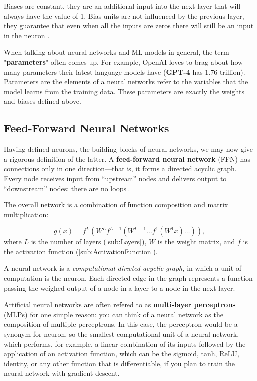 \documentclass{article}
\begin{document}
\begin{definition}[Bias]\label{def:bias}
  Biases are constant, they are an additional input into the next layer that will always have the value of 1. Bias units are not influenced by the previous layer, they guarantee that even when all the inputs are zeros there will still be an input in the neuron \citep{WeightsBias}. 
\end{definition}

When talking about neural networks and ML models in general, the term "\textbf{parameters}" often comes up. For example, OpenAI loves to brag about how many parameters their latest language models have (\textbf{GPT-4} has $1.76$ trillion). Parameters are the elements of a neural networks refer to the variables that the model learns from the training data. These parameters are exactly the weights and biases defined above.
\subsection{Feed-Forward Neural Networks}%
  \label{sub:Feed-Forward Neural Networks}
  Having defined neurons, the building blocks of neural networks, we may now give a rigorous definition of the latter. A \textbf{feed-forward neural network} (FFN) has connections only in one direction—that is, it forms a directed acyclic graph. Every node receives input from “upstream” nodes and delivers output to “downstream” nodes; there are no loops \citep{book:AIModernApp}.

The overall network is a combination of function composition and matrix multiplication:

  $$g(x) = f^L (W^Lf^{L-1}(W^{L-1} \hdots f^1(W^1x)\hdots)), $$
  where $L$ is the number of layers (\autoref{sub:Layers}), $W$ is the weight matrix, and $f$ is the activation function (\autoref{sub:ActivationFunction}).
 \begin{definition}
  A neural network is a \textit{computational directed acyclic graph,} in which a unit of computation is the neuron. Each directed edge in the graph represents a function passing the weighed output of a node in a layer to a node in the next layer.
 \end{definition} 

   Artificial neural networks are often refered to as \textbf{multi-layer perceptrons} (MLPs) for one simple reason: you can think of a neural network as the composition of multiple perceptrons. In this case, the perceptron would be a synonym for neuron, so the smallest computational unit of a neural network, which performs, for example, a linear combination of its inputs followed by the application of an activation function, which can be the sigmoid, tanh, ReLU, identity, or any other function that is differentiable, if you plan to train the neural network with gradient descent.
\end{document}
